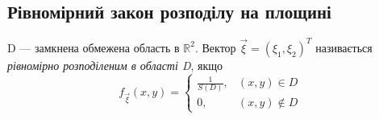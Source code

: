 \subsection{Рівномірний закон розподілу на площині}
\begin{definition}
    D --- замкнена обмежена область в $\mathbb{R}^2$. 
    Вектор $\vec{\xi} = (\xi_1,\xi_2)^T$ називається 
    \emph{рівномірно розподіленим в області D}, якщо 
    \begin{equation*}
        f_{\vec{\xi}}(x, y) = 
        \begin{cases}
            \frac{1}{S(D)},&(x, y) \in D \\
            0,&(x, y) \notin D
        \end{cases}
    \end{equation*}
\end{definition}

